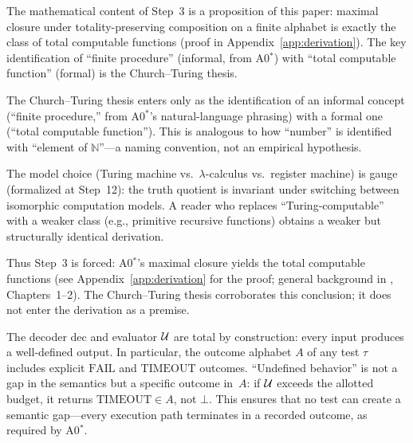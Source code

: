 \begin{remark}
\label{rem:ct-localization}
The mathematical content of Step~3 is a proposition of this paper:
maximal closure under totality-preserving composition on a finite
alphabet is exactly the class of total computable functions (proof in
Appendix~\ref{app:derivation}).  The key identification of ``finite
procedure'' (informal, from A0$^*$) with ``total computable function''
(formal) is the Church--Turing thesis.

The Church--Turing thesis enters only as the identification of an
informal concept (``finite procedure,'' from A0$^*$'s natural-language
phrasing) with a formal one (``total computable function'').  This is
analogous to how ``number'' is identified with ``element of
$\mathbb{N}$''---a naming convention, not an empirical hypothesis.

The model choice (Turing machine vs.\ $\lambda$-calculus vs.\ register
machine) is gauge (formalized at Step~12): the truth quotient is
invariant under switching between isomorphic computation models.  A
reader who replaces ``Turing-computable'' with a weaker class (e.g.,
primitive recursive functions) obtains a weaker but structurally
identical derivation.

Thus Step~3 is forced: A0$^*$'s maximal closure yields the total computable
functions (see Appendix~\ref{app:derivation} for the proof; general
background in \citealt{rogers1967}, Chapters~1--2).  The Church--Turing
thesis corroborates this conclusion; it does not enter the derivation
as a premise.
\end{remark}

\begin{remark}
\label{rem:total-semantics}
The decoder $\mathrm{dec}$ and evaluator $\mathcal{U}$ are total by
construction: every input produces a well-defined output.  In
particular, the outcome alphabet $A$ of any test $\tau$ includes
explicit $\mathrm{FAIL}$ and $\mathrm{TIMEOUT}$ outcomes.
``Undefined behavior'' is not a gap in the semantics but a
specific outcome in~$A$: if $\mathcal{U}$ exceeds the allotted budget,
it returns $\mathrm{TIMEOUT} \in A$, not $\bot$.  This ensures
that no test can create a semantic gap---every execution path
terminates in a recorded outcome, as required by A0$^*$.
\end{remark}


